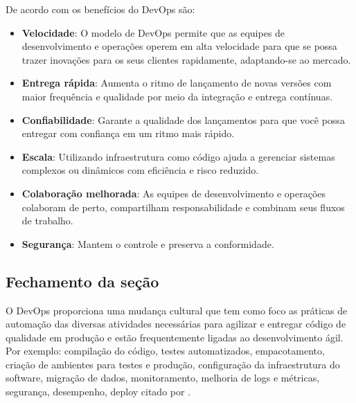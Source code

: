 De acordo com \cite{amazon} os benefícios do DevOps são:

\begin{itemize}
  \item \textbf{Velocidade}: O modelo de DevOps permite que as equipes de desenvolvimento e operações operem em alta velocidade para que se possa trazer inovações para os seus clientes rapidamente, adaptando-se ao mercado.
  \item \textbf{Entrega rápida}: Aumenta o ritmo de lançamento de novas versões com maior frequência e qualidade por meio da integração e entrega contínuas.
  \item \textbf{Confiabilidade}: Garante a qualidade dos lançamentos para que você possa entregar com confiança em um ritmo mais rápido.
  \item \textbf{Escala}: Utilizando infraestrutura como código ajuda a gerenciar sistemas complexos ou dinâmicos com eficiência e risco reduzido.
  \item \textbf{Colaboração melhorada}: As equipes de desenvolvimento e operações colaboram de perto, compartilham responsabilidade e combinam seus fluxos de trabalho.
  \item \textbf{Segurança}: Mantem o controle e preserva a conformidade.
\end{itemize}

\subsection{Fechamento da seção}

O DevOps proporciona uma mudança cultural que tem como foco as práticas de automação das diversas atividades necessárias para agilizar e entregar código de qualidade em produção e estão frequentemente ligadas ao desenvolvimento ágil. Por exemplo: compilação do código, testes automatizados, empacotamento, criação de ambientes para testes e produção, configuração da infraestrutura do software, migração de dados, monitoramento, melhoria de logs e métricas, segurança, desempenho, deploy \cite{sato} citado por \cite{correa}.
